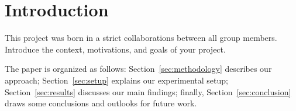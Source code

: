 \section{Introduction}
\label{sec:introduction}


This project was born in a strict collaborations between all group members.
Introduce the context, motivations, and goals of your project.

The paper is organized as follows: Section~\ref{sec:methodology} describes our approach; Section~\ref{sec:setup} explains our experimental setup; Section~\ref{sec:results} discusses our main findings; finally, Section~\ref{sec:conclusion} draws some conclusions and outlooks for future work.